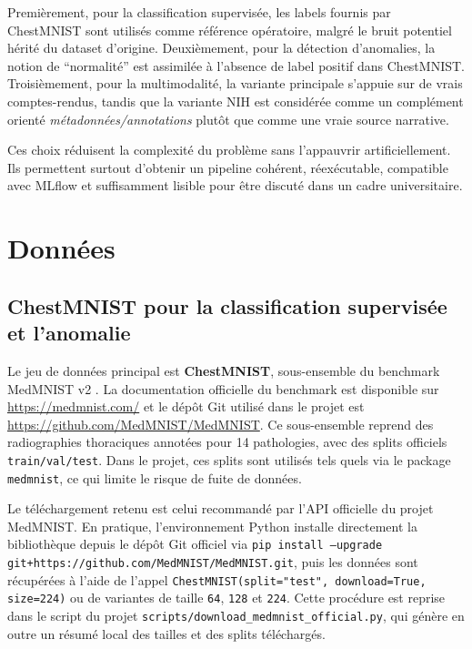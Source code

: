 \documentclass[11pt,a4paper]{article}
\newif\ifsectionbreakenabled
\let\oldsection\section
\renewcommand{\section}[1]{%
    \ifsectionbreakenabled
        \clearpage
    \else
        \sectionbreakenabledtrue
    \fi
    \oldsection{#1}%
}
\begin{document}
Premi\`erement, pour la classification supervis\'ee, les labels fournis par ChestMNIST sont utilis\'es comme r\'ef\'erence op\'eratoire, malgr\'e le bruit potentiel h\'erit\'e du dataset d'origine. Deuxi\`emement, pour la d\'etection d'anomalies, la notion de ``normalit\'e'' est assimil\'ee \`a l'absence de label positif dans ChestMNIST. Troisi\`emement, pour la multimodalit\'e, la variante principale s'appuie sur de vrais comptes-rendus, tandis que la variante NIH est consid\'er\'ee comme un compl\'ement orient\'e \emph{m\'etadonn\'ees/annotations} plut\^ot que comme une vraie source narrative.

Ces choix r\'eduisent la complexit\'e du probl\`eme sans l'appauvrir artificiellement. Ils permettent surtout d'obtenir un pipeline coh\'erent, r\'eex\'ecutable, compatible avec MLflow et suffisamment lisible pour \^etre discut\'e dans un cadre universitaire.

\section{Donn\'ees}
\subsection{ChestMNIST pour la classification supervis\'ee et l'anomalie}
Le jeu de donn\'ees principal est \textbf{ChestMNIST}, sous-ensemble du benchmark MedMNIST v2 \cite{yang2023medmnist}. La documentation officielle du benchmark est disponible sur \url{https://medmnist.com/} et le d\'ep\^ot Git utilis\'e dans le projet est \url{https://github.com/MedMNIST/MedMNIST}. Ce sous-ensemble reprend des radiographies thoraciques annot\'ees pour 14 pathologies, avec des splits officiels \texttt{train/val/test}. Dans le projet, ces splits sont utilis\'es tels quels via le package \texttt{medmnist}, ce qui limite le risque de fuite de donn\'ees.

Le t\'el\'echargement retenu est celui recommand\'e par l'API officielle du projet MedMNIST. En pratique, l'environnement Python installe directement la biblioth\`eque depuis le d\'ep\^ot Git officiel via \texttt{pip install --upgrade git+https://github.com/MedMNIST/MedMNIST.git}, puis les donn\'ees sont r\'ecup\'er\'ees \`a l'aide de l'appel \texttt{ChestMNIST(split="test", download=True, size=224)} ou de variantes de taille \texttt{64}, \texttt{128} et \texttt{224}. Cette proc\'edure est reprise dans le script du projet \texttt{scripts/download\_medmnist\_official.py}, qui g\'en\`ere en outre un r\'esum\'e local des tailles et des splits t\'el\'echarg\'es.
\end{document}
